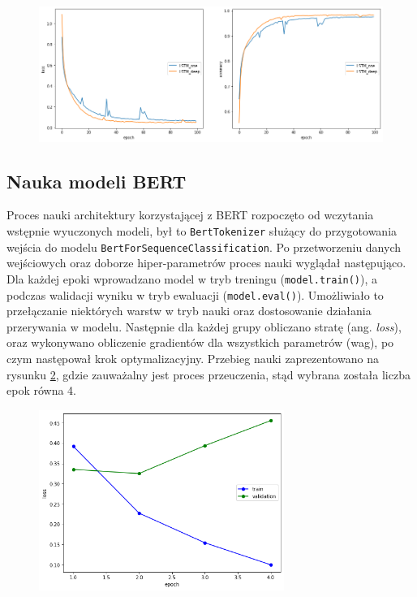\begin{figure}[t]
\centering\includegraphics[width=\textwidth]{figures/reports/lstm_one_deep_comparison.png}
\label{rys:lstm_one_deep_comparison}
\end{figure}

\subsection{Nauka modeli BERT}

Proces nauki architektury korzystającej z BERT rozpoczęto od wczytania wstępnie wyuczonych modeli, był to \texttt{BertTokenizer} służący do przygotowania wejścia do modelu \texttt{BertForSequenceClassification}. Po przetworzeniu danych wejściowych oraz doborze hiper-parametrów proces nauki wyglądał następująco. Dla każdej epoki wprowadzano model w tryb treningu (\texttt{model.train()}), a podczas walidacji wyniku w tryb ewaluacji (\texttt{model.eval()}). Umożliwiało to przełączanie niektórych warstw w tryb nauki oraz dostosowanie działania przerywania w modelu. Następnie dla każdej grupy obliczano stratę (ang. \textit{loss}), oraz wykonywano obliczenie gradientów dla wszystkich parametrów (wag), po czym następował krok optymalizacyjny. Przebieg nauki zaprezentowano na rysunku \ref{rys:bert_nauka}, gdzie zauważalny jest proces przeuczenia, stąd wybrana została liczba epok równa 4.


\begin{figure}[t]
\centering\includegraphics[width=8cm]{figures/reports/bert_nauka.png}
\label{rys:bert_nauka}
\end{figure}

